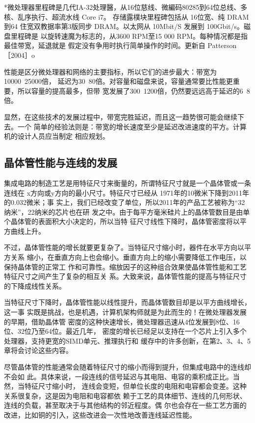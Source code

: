 *微处理器里程碑是几代IA-32处理醫，从16位慈线、微編码80285到64位总线、多核、乱序执行、超流水线 Core i7。
存储露樸块里程碑包括从 16位宽、纯 DRAM 到64 住宽双教据率第3版同步 DRAM。以太网从 10Mbit/S 发展到
100Gbit/s。磁盘里程碑是 以旋转速魔为标志的，从3600 RPM至15 000 RPM。每种情况都是指最佳带宽，延退就是
假定没有争用时执行简单操作的时间。更新自 Patterson［2004］o

性能是区分微处理器和网络的主要指标，所以它们的进步最大：带宽为10000~25000倍，
延迟为30~80倍。对容量和磁盘来说，容量通常要比性能更重要，所以容量的提高最多，但带
宽发展了300~1200倍，仍然要远远高于延迟的6~8倍。

显然，在这些技术的发展过程中，带宽完胜延迟，而且这一趋势很可能会继续下去。一个
简单的经验法则是：带宽的增长速度至少是延迟改进速度的平方。计算机的设计人员应当制定
相应规划。

\subsection{晶体管性能与连线的发展}
集成电路的制造工艺是用特征尺寸来衡量的，所谓特征尺寸就是一个晶体管或一条连线在
x方向或y方向的最小尺寸。特征尺寸已经从 1971年的10微米下降到2011年的0.032微米；事
实上，我们已经改变了单位，所以2011年的产品工艺被称为“32纳米”，22纳米的芯片也在研
发之中。由于每平方毫米硅片上的晶体管数目是由单个晶体管的表面积大小决定的，所以当特
征尺寸线性下降时，晶体管密度将以平方曲线上升。

不过，晶体管性能的增长就要更复杂了。当特征尺寸缩小时，器件在水平方向以平方关系
缩小，在垂直方向上也会缩小。垂直方向上的缩小需要降低工作电压，以保持晶体管的正常工
作和可靠性。缩放因子的这种组合效果使晶体管性能和工艺特征尺寸之间产生了复杂的相互关
系。大致来说，晶体管性能的提高与特征尺寸的下降成线性关系。

当特征尺寸下降时，晶体管性能以线性提升，而晶体管数目却是以平方曲线增长，这一事
实既是挑战，也是机遇，计算机架构师就是为此而生的！在微处理器发展的早期，借助晶体管
密度的这种快速增长，微处理器迅速从4位发展到8位、16位、32位乃至64位。最近几年，
密度的增长已经足以支持在一个芯片上引入多个处理器，支持更宽的SIMD单元、推理执行和
缓存中的许多创新，在第2、3、4、5章将会讨论这些内容。

尽管晶体管的性能通常会随着特征尺寸的缩小而得到提升，但集成电路中的连线却不会如
此。具体来说，一段连线的信号延迟与其电阻、电容的乘积成正比。当然，当特征尺寸缩小时，
连线会变短，但单位长度的电阻和电容都会变差。这种关系很复杂，这是因为电阻和电容都依
赖于工艺的具体细节、连线的几何形状、连线的负载，甚至取决于与其他结构的邻近程度。偶
尔也会存在一些工艺方面的改进，比如铜的引入，这些改进会一次性地改善连线延迟性能。

